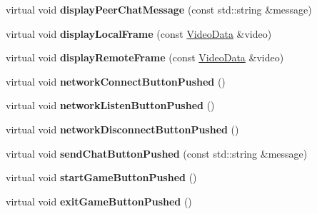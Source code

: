 \begin{DoxyCompactItemize}
\item 
\hypertarget{classMFCUserInterface_a211917cb2e10228e4cabd54d5b411106}{
virtual void {\bfseries displayPeerChatMessage} (const std::string \&message)}
\label{classMFCUserInterface_a211917cb2e10228e4cabd54d5b411106}

\item 
\hypertarget{classMFCUserInterface_a93930bcf41087f4f1c0380f12b190714}{
virtual void {\bfseries displayLocalFrame} (const \hyperlink{structVideoData}{VideoData} \&video)}
\label{classMFCUserInterface_a93930bcf41087f4f1c0380f12b190714}

\item 
\hypertarget{classMFCUserInterface_afea24df787ef3ebdd57ad7c6435e14cc}{
virtual void {\bfseries displayRemoteFrame} (const \hyperlink{structVideoData}{VideoData} \&video)}
\label{classMFCUserInterface_afea24df787ef3ebdd57ad7c6435e14cc}

\item 
\hypertarget{classMFCUserInterface_a25bf67955e01502250d4239ea6dc9e6d}{
virtual void {\bfseries networkConnectButtonPushed} ()}
\label{classMFCUserInterface_a25bf67955e01502250d4239ea6dc9e6d}

\item 
\hypertarget{classMFCUserInterface_ad19ff1d9fe21137d564c7f91d6d9638a}{
virtual void {\bfseries networkListenButtonPushed} ()}
\label{classMFCUserInterface_ad19ff1d9fe21137d564c7f91d6d9638a}

\item 
\hypertarget{classMFCUserInterface_a05124c9a819899bf74dbbbd1ba27d32d}{
virtual void {\bfseries networkDisconnectButtonPushed} ()}
\label{classMFCUserInterface_a05124c9a819899bf74dbbbd1ba27d32d}

\item 
\hypertarget{classMFCUserInterface_a645879dc2e81a2d2810d215bbc435d87}{
virtual void {\bfseries sendChatButtonPushed} (const std::string \&message)}
\label{classMFCUserInterface_a645879dc2e81a2d2810d215bbc435d87}

\item 
\hypertarget{classMFCUserInterface_a3ded83efa5ecbc38a21051dd90dc661e}{
virtual void {\bfseries startGameButtonPushed} ()}
\label{classMFCUserInterface_a3ded83efa5ecbc38a21051dd90dc661e}

\item 
\hypertarget{classMFCUserInterface_a0bfd2943d3cf9e704bb71880eb3aa865}{
virtual void {\bfseries exitGameButtonPushed} ()}
\label{classMFCUserInterface_a0bfd2943d3cf9e704bb71880eb3aa865}


\end{DoxyCompactItemize}
